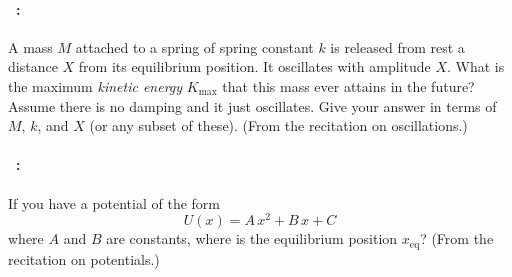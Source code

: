 \documentclass[12pt]{article} 
\begin{document}
\vfill

\paragraph{\problemname~\theproblem:}%
A mass $M$ attached to a spring of spring constant $k$ is released
from rest a distance $X$ from its equilibrium position. It oscillates
with amplitude $X$. What is the maximum \emph{kinetic energy} $K_{\mathrm{max}}$ that
this mass ever attains in the future? Assume there is no damping and
it just oscillates. Give your answer in terms of $M$, $k$, and $X$ (or
any subset of these). (From the recitation on oscillations.)

\vfill

\paragraph{\problemname~\theproblem:}%
If you have a potential of the form
$$
U(x) = A\,x^2 + B\,x + C
$$ where $A$ and $B$ are constants, where is the equilibrium position
$x_{\mathrm{eq}}$?  (From the recitation on potentials.)

\vfill
~
\end{document}
